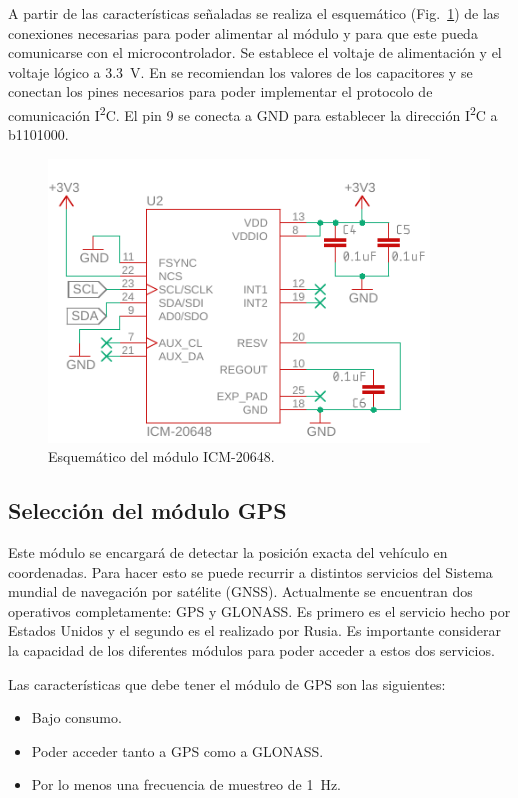 A partir de las características señaladas se realiza el esquemático (Fig.~\ref{fig:IMU_esquem}) de las conexiones necesarias para poder alimentar al módulo y para que este pueda comunicarse con el microcontrolador. Se establece el voltaje de alimentación y el voltaje lógico a \SI{3.3}{V}. En \cite{ICM20648} se recomiendan los valores de los capacitores y se conectan los pines necesarios para poder implementar el protocolo de comunicación I\textsuperscript{2}C. El pin 9 se conecta a GND para establecer la dirección I\textsuperscript{2}C a b1101000.

\begin{figure}[htbp!]
\centering
\includegraphics[width=0.9\textwidth]{IMU_esquem.pdf}
\caption{Esquemático del módulo ICM-20648.}
\label{fig:IMU_esquem}
\end{figure}

\subsection{Selección del módulo GPS}
Este módulo se encargará de detectar la posición exacta del vehículo en coordenadas. Para hacer esto se puede recurrir a distintos servicios del Sistema mundial de navegación por satélite (GNSS). Actualmente se encuentran dos operativos completamente: GPS y GLONASS. Es primero es el servicio hecho por Estados Unidos y el segundo es el realizado por Rusia. Es importante considerar la capacidad de los diferentes módulos para poder acceder a estos dos servicios.

Las características que debe tener el módulo de GPS son las siguientes:
\begin{itemize}
    \itemsep0em
    \item Bajo consumo.
    \item Poder acceder tanto a GPS como a GLONASS.
    \item Por lo menos una frecuencia de muestreo de \SI{1}{Hz}.
\end{itemize}


